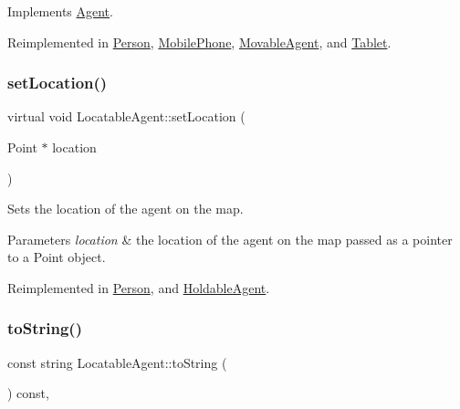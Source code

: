 Implements \mbox{\hyperlink{class_agent_afe6c72d91baf9ee4fe77ea1ed7fef3ba}{Agent}}.



Reimplemented in \mbox{\hyperlink{class_person_aa2a6f8d7f1d94045a03ca578f2ed272c}{Person}}, \mbox{\hyperlink{class_mobile_phone_a1eeac3141baafa75ebcf26fc3a0e4068}{Mobile\+Phone}}, \mbox{\hyperlink{class_movable_agent_abcc1218876c39c996f2cb1eba2b96379}{Movable\+Agent}}, and \mbox{\hyperlink{class_tablet_adc7196aaee1e9714236b7cd8825d5826}{Tablet}}.

\mbox{\label{class_locatable_agent_a754b237c404b77714fedd397f214bc02}} 
\subsubsection{\texorpdfstring{setLocation()}{setLocation()}}
{\footnotesize\ttfamily virtual void Locatable\+Agent\+::set\+Location (\begin{DoxyParamCaption}\item[{Point $\ast$}]{location }\end{DoxyParamCaption})\hspace{0.3cm}{\ttfamily [virtual]}}

Sets the location of the agent on the map. 
\begin{DoxyParams}{Parameters}
{\em location} & the location of the agent on the map passed as a pointer to a Point object. \\
\hline
\end{DoxyParams}


Reimplemented in \mbox{\hyperlink{class_person_a05f4ac2107d59e03f0f336eda08aa358}{Person}}, and \mbox{\hyperlink{class_holdable_agent_aec98d2fe325b48d9a84ad3dad44700e0}{Holdable\+Agent}}.

\mbox{\label{class_locatable_agent_a88674f4c8ab9b1b2f3986b226bf4244f}} 
\subsubsection{\texorpdfstring{toString()}{toString()}}
{\footnotesize\ttfamily const string Locatable\+Agent\+::to\+String (\begin{DoxyParamCaption}{ }\end{DoxyParamCaption}) const\hspace{0.3cm}{\ttfamily [override]}, {\ttfamily [virtual]}}

